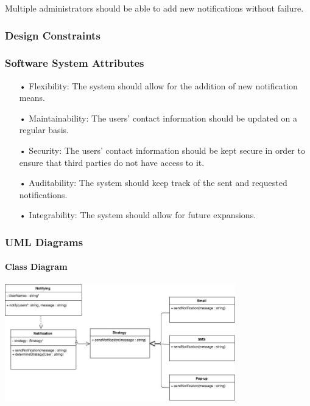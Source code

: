 \documentclass[runningheads,a4paper]{article}
\begin{document}
Multiple administrators should be able to add new notifications without failure.



\subsubsection{Design Constraints}



\subsubsection{Software System Attributes}
\begin{enumerate}

\item[•] Flexibility: The system should allow for the addition of new notification means.
\item[•]Maintainability: The users’ contact information should be updated on a regular basis.
\item[•]Security: The users’ contact information should be kept secure in order to ensure that third parties do not have access to it.
\item[•]Auditability: The system should keep track of the sent and requested notifications.
\item[•]Integrability: The system should allow for future expansions.

\end{enumerate}



\subsubsection{UML Diagrams}
\paragraph{Class Diagram}
\begin{center}
\includegraphics[width=10cm]{ClassDiagram.png}\\
\end{center}
\end{document}
